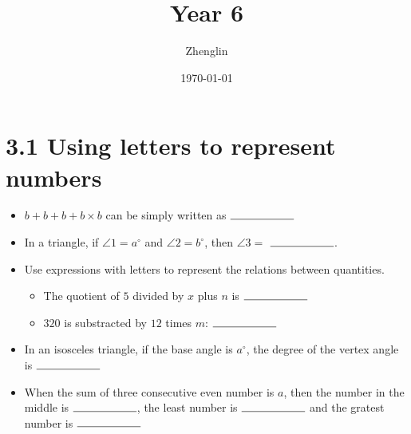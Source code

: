 \documentclass{article}%
\title{Year 6}%
\author{Zhenglin}%
\date{\today}%
\begin{document}
%
\normalsize%
\maketitle%
\section*{3.1 Using letters to represent numbers}%
\begin{itemize}%
\item%
$b+b+b+b\times b$ can be simply written as $\rule{2cm}{0.15mm}$%
\item%
In a triangle, if $\angle 1=a^{\circ}$ and $\angle 2=b^{\circ}$, then $\angle 3=$ $\rule{2cm}{0.15mm}$.%
\item%
Use expressions with letters to represent the relations between quantities.%
\begin{itemize}%
\item%
The quotient of $5$ divided by $x$ plus $n$ is $\rule{2cm}{0.15mm}$%
\item%
$320$ is substracted by $12$ times $m$: $\rule{2cm}{0.15mm}$%
\end{itemize}%
\item%
In an isosceles triangle, if the base angle is $a^{\circ}$, the degree of the vertex angle is $\rule{2cm}{0.15mm}$%
\item%
When the sum of three consecutive even number is $a$, then the number in the middle is $\rule{2cm}{0.15mm}$, the least number is $\rule{2cm}{0.15mm}$ and the gratest number is $\rule{2cm}{0.15mm}$%
\end{itemize}

%
\end{document}
